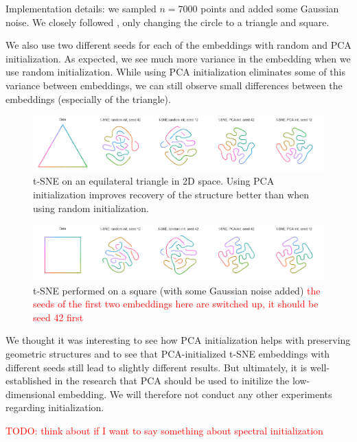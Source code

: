 Implementation details: we sampled $n=7000$ points and added some Gaussian noise. We closely followed \cite{kobak21}, only changing the circle to a triangle and square. 

We also use two different seeds for each of the embeddings with random and PCA initialization. 
As expected, we see much more variance in the embedding when we use random initialization. While using PCA initialization eliminates some of this variance between embeddings, we can still observe small differences between the embeddings (especially of the triangle). 

\begin{figure}[h]
    \centering 
        \includegraphics[width=\linewidth]{figures/t_sne_on_triangle.png}
        \caption{t-SNE on an equilateral triangle in 2D space. Using PCA initialization improves recovery of the structure better than when using random initialization.}
    \label{fig:triangle}
\end{figure}

\begin{figure}[h]
    \centering 
        \includegraphics[width=\linewidth]{figures/t_sne_on_square.png}
        \caption{t-SNE performed on a square (with some Gaussian noise added) \textcolor{red}{the seeds of the first two embeddings here are switched up, it should be seed 42 first}}
    \label{fig:square}
\end{figure}

We thought it was interesting to see how PCA initialization helps with preserving geometric structures and to see that PCA-initialized t-SNE embeddings with different seeds still lead to slightly different results. 
But ultimately, it is well-established in the research that PCA should be used to initilize the low-dimensional embedding. 
We will therefore not conduct any other experiments regarding initialization. 

\textcolor{red}{TODO: think about if I want to say something about spectral initialization}

